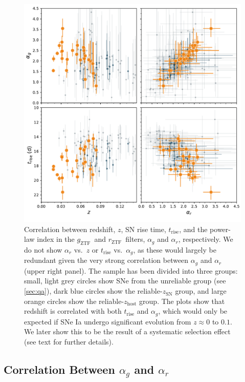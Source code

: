 \documentclass[twocolumn]{aastex63}
\newcommand{\rztf}{$r_\mathrm{ZTF}$}
\newcommand{\gztf}{$g_\mathrm{ZTF}$}
\begin{document}
\begin{figure}
    \centering
    \includegraphics[width=6in]{./figures/param_correlations.pdf}
    \caption{Correlation between redshift, $z$, SN rise time,
    $t_\mathrm{rise}$, and the power-law index in the \gztf\ and \rztf\
    filters, $\alpha_g$ and $\alpha_r$, respectively. We do not show
    $\alpha_r$ vs.~$z$ or $t_\mathrm{rise}$ vs.~$\alpha_g$, as these would
    largely be redundant given the very strong correlation between $\alpha_g$
    and $\alpha_r$ (upper right panel). The sample has been divided into three
    groups: small, light grey circles show SNe from the unreliable group (see
    \ref{sec:qa}), dark blue circles show the reliable-$z_\mathrm{SN}$ group,
    and large orange circles show the reliable-$z_\mathrm{host}$ group. The
    plots show that redshift is correlated with both $t_\mathrm{rise}$ and
    $\alpha_g$, which would only be expected if SNe Ia undergo significant
    evolution from $z \approx 0$ to $0.1$. We later show this to be the result
    of a systematic selection effect (see text for further details). }
    \label{fig:model_parameters}
\end{figure}

\subsection{Correlation Between $\alpha_g$ and $\alpha_r$}\label{sec:alpha_correlation}
\end{document}
